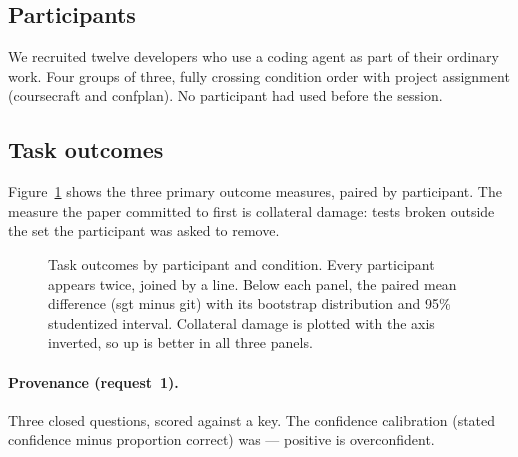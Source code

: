 \subsection{Participants}

We recruited twelve developers who use a coding agent as part of their ordinary
work.  Four groups of
three, fully crossing condition order with project assignment (coursecraft and
confplan). No participant had used \sgt{} before the session.

\subsection{Task outcomes}
\label{sec:findings-outcomes}

Figure~\ref{fig:outcomes} shows the three primary outcome measures, paired by
participant. The measure the paper committed to first is collateral damage:
tests broken outside the set the participant was asked to remove.

\begin{figure}[t]
  \centering
  \caption{Task outcomes by participant and condition. Every participant appears
  twice, joined by a line. Below each panel, the paired mean difference (sgt
  minus git) with its bootstrap distribution and 95\% studentized interval.
  Collateral damage is plotted with the axis inverted, so up is better in all
  three panels.}
  \label{fig:outcomes}
\end{figure}

\paragraph{Provenance (request~1).}
Three closed questions, scored against a key.
The confidence calibration (stated confidence minus proportion correct)
was  --- positive is
overconfident. 

